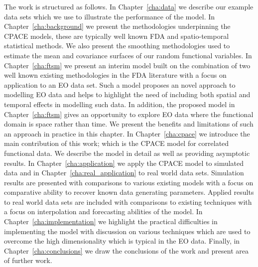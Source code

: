 The work is structured as follows.
In Chapter~\ref{cha:data} we describe our example data sets which we use to illustrate the performance of the model.
In Chapter~\ref{cha:background} we present the methodologies underpinning the CPACE models, these are typically well known FDA and spatio-temporal statistical methods.
We also present the smoothing methodologies used to estimate the mean and covariance surfaces of our random functional variables.
In Chapter~\ref{cha:ftsm} we present an interim model built on the combination of two well known existing methodologies in the FDA literature with a focus on application to an EO data set.
Such a model proposes an novel approach to modelling EO data and helps to highlight the need of including both spatial and temporal effects in modelling such data.
In addition, the proposed model in Chapter~\ref{cha:ftsm} gives an opportunity to explore EO data where the functional domain is space rather than time.
We present the benefits and limitations of such an approach in practice in this chapter.
In Chapter~\ref{cha:cpace} we introduce the main contribution of this work; which is the CPACE model for correlated functional data.
We describe the model in detail as well as providing asymptotic results.
In Chapter~\ref{cha:application} we apply the CPACE model to simulated data and in Chapter~\ref{cha:real_application} to real world data sets.
Simulation results are presented with comparisons to various existing models with a focus on comparative ability to recover known data generating parameters.
Applied results to real world data sets are included with comparisons to existing techniques with a focus on interpolation and forecasting abilities of the model.
In Chapter~\ref{cha:implementation} we highlight the practical difficulties in implementing the model with discussion on various techniques which are used to overcome the high dimensionality which is typical in the EO data.
Finally, in Chapter~\ref{cha:conclusions} we draw the conclusions of the work and present area of further work. 